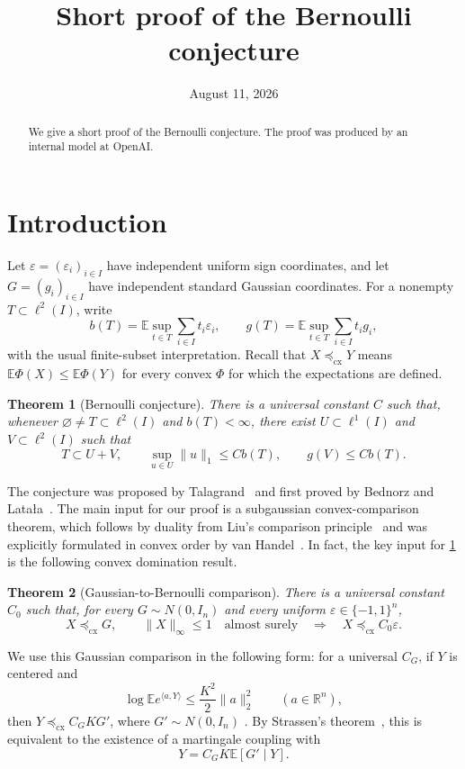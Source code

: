 \documentclass[11pt,reqno]{amsart}
\title[Short proof of the Bernoulli conjecture]
{Short proof of the Bernoulli conjecture}
\author{}
\date{August 11, 2026}
\newtheorem{theorem}{Theorem}[section]
\newcommand{\E}{\mathbb E}
\newcommand{\R}{\mathbb R}
\newcommand{\cx}{\preceq_{\mathrm{cx}}}
\newcommand{\ip}[2]{\langle #1,#2\rangle}
\begin{document}
\begin{abstract}
We give a short proof of the Bernoulli conjecture. The proof was produced
by an internal model at OpenAI.
\end{abstract}

\maketitle

\section{Introduction}

Let $\varepsilon=(\varepsilon_i)_{i\in I}$ have independent uniform sign
coordinates, and let $G=(g_i)_{i\in I}$ have independent standard Gaussian
coordinates. For a nonempty $T\subset\ell^2(I)$, write
\[
 b(T)=\E\sup_{t\in T}\sum_{i\in I}t_i\varepsilon_i,
 \qquad
 g(T)=\E\sup_{t\in T}\sum_{i\in I}t_i g_i,
\]
with the usual finite-subset interpretation. Recall that $X\cx Y$ means
$\E\Phi(X)\leq\E\Phi(Y)$ for every convex $\Phi$ for which the expectations
are defined.

\begin{theorem}[Bernoulli conjecture]\label{thm:bernoulli}
There is a universal constant $C$ such that, whenever
$\varnothing\ne T\subset\ell^2(I)$ and $b(T)<\infty$, there exist
$U\subset\ell^1(I)$ and $V\subset\ell^2(I)$ such that
\[
 T\subset U+V,
 \qquad
 \sup_{u\in U}\|u\|_1\leq Cb(T),
 \qquad
 g(V)\leq Cb(T).
\]
\end{theorem}

The conjecture was proposed by Talagrand~\cite{Talagrand} and first proved
by Bednorz and Lata\l a~\cite{BednorzLatala}. The main input for our proof
is a subgaussian convex-comparison theorem, which follows by duality from
Liu's comparison principle~\cite[Corollary~2]{LiuLifting} and was
explicitly formulated in convex order by van Handel~\cite{vanHandel}.
In fact, the key input for \cref{thm:bernoulli} is the following convex
domination result.

\begin{theorem}[Gaussian-to-Bernoulli comparison]\label{thm:comparison}
There is a universal constant $C_0$ such that, for every
$G\sim N(0,I_n)$ and every uniform
$\varepsilon\in\{-1,1\}^n$,
\[
 X\cx G,\qquad \|X\|_\infty\leq1\quad\text{almost surely}
 \quad\Longrightarrow\quad
 X\cx C_0\varepsilon.
\]
\end{theorem}

We use this Gaussian comparison in the following form: for a
universal $C_G$, if $Y$ is centered and
\begin{equation}\label{eq:subgaussian}
 \log\E e^{\ip{a}{Y}}
 \leq\frac{K^2}{2}\|a\|_2^2
 \qquad(a\in\R^n),
\end{equation}
then $Y\cx C_GK G'$, where $G'\sim N(0,I_n)$
\cite{vanHandel}. By Strassen's theorem~\cite{Strassen}, this is
equivalent to the existence of a martingale coupling with
\begin{equation}\label{eq:gaussian-martingale}
 Y=C_GK\E[G'\mid Y].
\end{equation}
\end{document}
